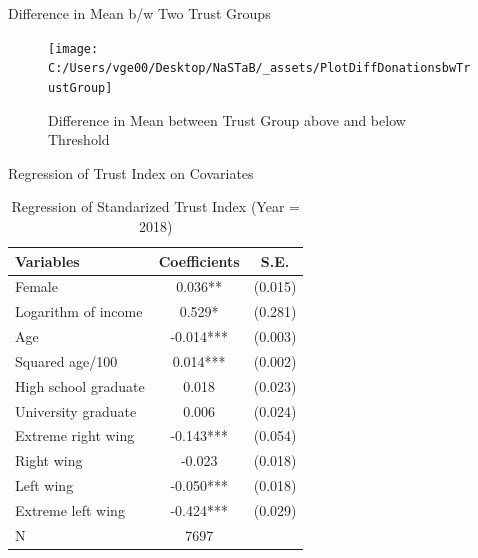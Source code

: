 \documentclass[
  ignorenonframetext,
]{beamer}
\begin{document}
\begin{frame}{Difference in Mean b/w Two Trust Groups}
\protect\hypertarget{difference-in-mean-bw-two-trust-groups}{}
\begin{figure}
\texttt{[image: C:/Users/vge00/Desktop/NaSTaB/\_assets/PlotDiffDonationsbwTrustGroup]} \caption{Difference in Mean between Trust Group above and below Threshold}\label{fig:unnamed-chunk-5}
\end{figure}
\end{frame}

\begin{frame}{Regression of Trust Index on Covariates}
\protect\hypertarget{regression-of-trust-index-on-covariates}{}
\begin{table}

\caption{\label{tab:kableRegTrustidOnCovariate}Regression of Standarized Trust Index (Year = 2018)}
\centering
\begin{tabular}[t]{lcc}
\toprule
Variables & Coefficients & S.E.\\
\midrule
Female & 0.036** & (0.015)\\
Logarithm of income & 0.529* & (0.281)\\
Age & -0.014*** & (0.003)\\
Squared age/100 & 0.014*** & (0.002)\\
High school graduate & 0.018 & (0.023)\\
University graduate & 0.006 & (0.024)\\
Extreme right wing & -0.143*** & (0.054)\\
Right wing & -0.023 & (0.018)\\
Left wing & -0.050*** & (0.018)\\
Extreme left wing & -0.424*** & (0.029)\\
N & 7697 & \\
\bottomrule
\end{tabular}
\end{table}
\end{frame}
\end{document}

